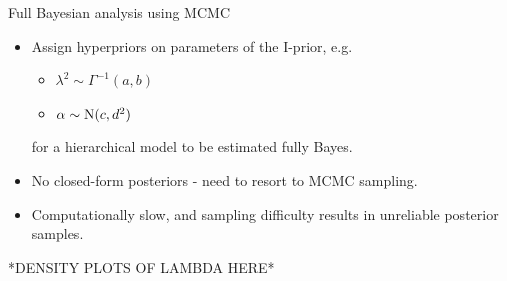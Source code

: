\begin{frame}{Full Bayesian analysis using MCMC}
  \begin{itemize}\setlength\itemsep{0.5em}
    \item Assign hyperpriors on parameters of the I-prior, e.g.
    \begin{itemize}
      \item $\lambda^2 \sim \Gamma^{-1}(a,b)$
      \item $\alpha \sim \operatorname{N}(c,d^2)$
    \end{itemize}
    for a hierarchical model to be estimated fully Bayes.
    \item No closed-form posteriors - need to resort to MCMC sampling.
    \item Computationally slow, and sampling difficulty results in unreliable posterior samples.
  \end{itemize}
  *DENSITY PLOTS OF LAMBDA HERE*
\end{frame}








